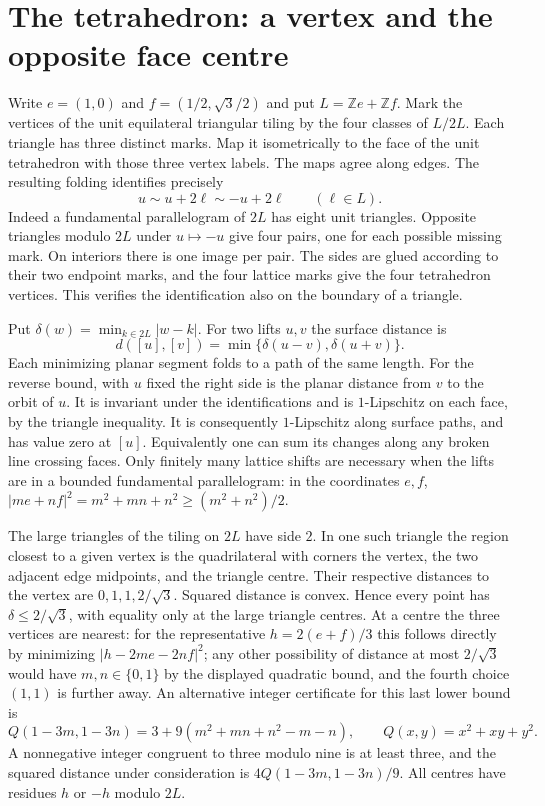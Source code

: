 \section{The tetrahedron: a vertex and the opposite face centre}
Write $e=(1,0)$ and $f=(1/2,\sqrt3/2)$ and put $L=\mathbb Ze+\mathbb Zf$. Mark the vertices of the unit equilateral triangular tiling by the four classes of $L/2L$. Each triangle has three distinct marks. Map it isometrically to the face of the unit tetrahedron with those three vertex labels. The maps agree along edges. The resulting folding identifies precisely
\[
 u\sim u+2\ell\sim -u+2\ell\qquad(\ell\in L).
\]
Indeed a fundamental parallelogram of $2L$ has eight unit triangles. Opposite triangles modulo $2L$ under $u\mapsto-u$ give four pairs, one for each possible missing mark. On interiors there is one image per pair. The sides are glued according to their two endpoint marks, and the four lattice marks give the four tetrahedron vertices. This verifies the identification also on the boundary of a triangle.

Put $\delta(w)=\min_{k\in2L}|w-k|$. For two lifts $u,v$ the surface distance is
\[
 d([u],[v])=\min\{\delta(u-v),\delta(u+v)\}.
\]
Each minimizing planar segment folds to a path of the same length. For the reverse bound, with $u$ fixed the right side is the planar distance from $v$ to the orbit of $u$. It is invariant under the identifications and is $1$-Lipschitz on each face, by the triangle inequality. It is consequently $1$-Lipschitz along surface paths, and has value zero at $[u]$. Equivalently one can sum its changes along any broken line crossing faces. Only finitely many lattice shifts are necessary when the lifts are in a bounded fundamental parallelogram: in the coordinates $e,f$, $|me+nf|^2=m^2+mn+n^2\ge(m^2+n^2)/2$.

The large triangles of the tiling on $2L$ have side $2$. In one such triangle the region closest to a given vertex is the quadrilateral with corners the vertex, the two adjacent edge midpoints, and the triangle centre. Their respective distances to the vertex are $0,1,1,2/\sqrt3$. Squared distance is convex. Hence every point has $\delta\le 2/\sqrt3$, with equality only at the large triangle centres. At a centre the three vertices are nearest: for the representative $h=2(e+f)/3$ this follows directly by minimizing $|h-2me-2nf|^2$; any other possibility of distance at most $2/\sqrt3$ would have $m,n\in\{0,1\}$ by the displayed quadratic bound, and the fourth choice $(1,1)$ is further away. An alternative integer certificate for this last lower bound is
\[
 Q(1-3m,1-3n)=3+9(m^2+mn+n^2-m-n),\qquad Q(x,y)=x^2+xy+y^2 .
\]
A nonnegative integer congruent to three modulo nine is at least three, and the squared distance under consideration is $4Q(1-3m,1-3n)/9$. All centres have residues $h$ or $-h$ modulo $2L$.

